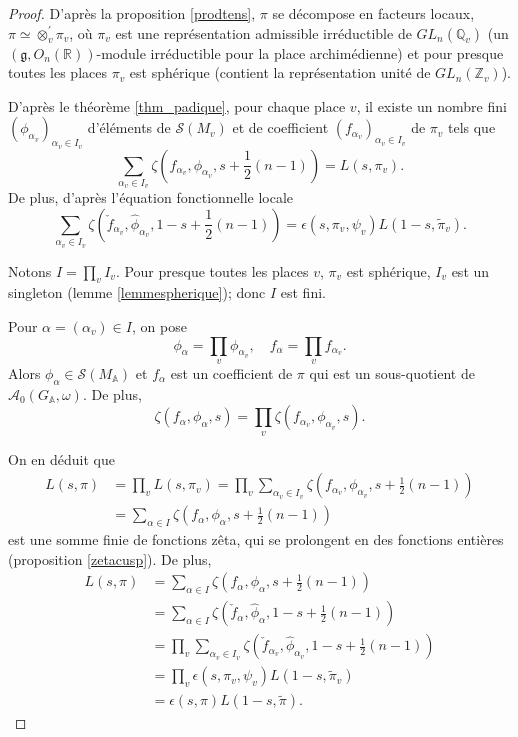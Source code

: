 \begin{proof}
D'après la proposition \ref{prodtens}, $\pi$ se décompose en facteurs locaux,
$\pi \simeq \otimes_v^{'} \pi_v$, où $\pi_v$ est une représentation admissible irréductible de $GL_n(\mathbb{Q}_v)$ (un $(\mathfrak{g}, O_n(\mathbb{R}))$-module irréductible pour la place archimédienne) et pour presque toutes les places $\pi_v$ est sphérique (contient la représentation unité de $GL_n(\mathbb{Z}_v)$).

D'après le théorème \ref{thm_padique}, pour chaque place $v$, il existe un nombre fini $(\phi_{\alpha_v})_{\alpha_v \in I_v}$ d'éléments de $\mathcal{S}(M_v)$ et de coefficient $(f_{\alpha_v})_{\alpha_v \in I_v}$ de $\pi_v$ tels que
\begin{equation}
\sum_{\alpha_v \in I_v} \zeta(f_{\alpha_v}, \phi_{\alpha_v}, s + \frac{1}{2}(n-1)) = L(s, \pi_v).
\end{equation}
De plus, d'après l'équation fonctionnelle locale
\begin{equation}
\sum_{\alpha_v \in I_v} \zeta(\check{f}_{\alpha_v}, \hat{\phi}_{\alpha_v}, 1-s + \frac{1}{2}(n-1)) = \epsilon(s,\pi_v,\psi_v)L(1-s, \tilde{\pi}_v).
\end{equation}

Notons $I = \prod_v I_v$. Pour presque toutes les places $v$, $\pi_v$ est sphérique, $I_v$ est un singleton (lemme \ref{lemmespherique}); donc $I$ est fini.

Pour $\alpha = (\alpha_v) \in I$, on pose
\begin{equation}
\phi_\alpha = \prod_v \phi_{\alpha_v}, \quad f_\alpha = \prod_v f_{\alpha_v}.
\end{equation}
Alors $\phi_\alpha \in \mathcal{S}(M_\mathbb{A})$ et $f_\alpha$ est un coefficient de $\pi$ qui est un sous-quotient de $\mathcal{A}_0(G_\mathbb{A}, \omega)$. De plus,
\begin{equation}
\zeta(f_\alpha, \phi_\alpha, s) = \prod_v \zeta(f_{\alpha_v}, \phi_{\alpha_v}, s).
\end{equation}

On en déduit que
\begin{align}
L(s, \pi) &= \prod_v L(s, \pi_v) = \prod_v \sum_{\alpha_v \in I_v} \zeta(f_{\alpha_v}, \phi_{\alpha_v}, s + \frac{1}{2}(n-1)) \\
&= \sum_{\alpha \in I} \zeta(f_\alpha, \phi_\alpha, s + \frac{1}{2}(n-1))
\end{align}
est une somme finie de fonctions zêta, qui se prolongent en des fonctions entières (proposition \ref{zetacusp}). De plus,
\begin{align}
L(s, \pi) &= \sum_{\alpha \in I} \zeta(f_\alpha, \phi_\alpha, s + \frac{1}{2}(n-1)) \\
&= \sum_{\alpha \in I} \zeta(\check{f}_\alpha, \hat{\phi}_\alpha, 1 - s + \frac{1}{2}(n-1)) \\
&= \prod_v \sum_{\alpha_v \in I_v} \zeta(\check{f}_{\alpha_v}, \hat{\phi}_{\alpha_v}, 1-s + \frac{1}{2}(n-1)) \\
&= \prod_v \epsilon(s, \pi_v, \psi_v) L(1-s, \tilde{\pi}_v) \\
&= \epsilon(s, \pi)L(1-s, \tilde{\pi}).
\end{align}
\end{proof}